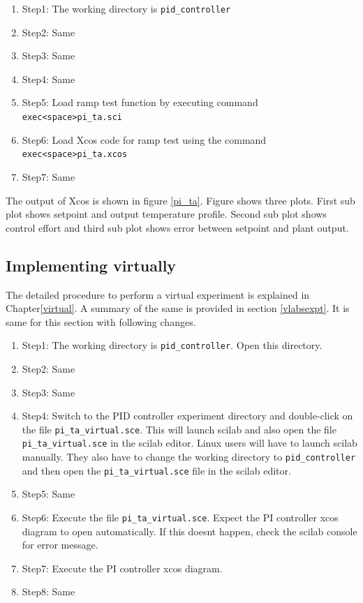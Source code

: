 \begin{enumerate}
\item Step1: The working directory is {\tt  pid\_controller}
\item Step2: Same
\item Step3: Same
\item Step4: Same
\item Step5: Load ramp test function by executing command\\ {\tt exec<space>pi\_ta.sci}
\item Step6: Load Xcos code for ramp test using the command\\ {\tt exec<space>pi\_ta.xcos}
\item Step7: Same
\end{enumerate}

The output of Xcos is shown in figure \ref{pi_ta}.
Figure shows three plots. First sub plot shows setpoint and output temperature profile. Second sub plot shows 
control effort and third sub plot shows error between setpoint and plant output.

\subsection{Implementing virtually}

The detailed procedure to perform a virtual experiment is explained in Chapter\ref{virtual}. A summary of the same is provided in section \ref{vlabsexpt}. It is same for this section with following changes.

\begin{enumerate}
\item Step1: The working directory is {\tt  pid\_controller}. Open this directory.
\item Step2: Same
\item Step3: Same
\item Step4:  Switch to the PID controller experiment directory and double-click on the file {\tt pi\_ta\_virtual.sce}. This will launch scilab and also open the file {\tt pi\_ta\_virtual.sce} in the scilab editor. Linux users will have to launch scilab manually. They also have to change the working directory to {\tt pid\_controller} and then open the {\tt  pi\_ta\_virtual.sce} file in the scilab editor.
\item Step5: Same
\item Step6: Execute the file {\tt pi\_ta\_virtual.sce}.  Expect the PI controller xcos diagram to open automatically. If this doesnt happen, check the scilab console for error message.
\item Step7: Execute the PI controller xcos diagram.
\item Step8: Same
\end{enumerate}


